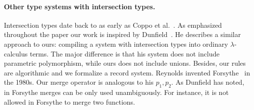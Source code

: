 \begin{comment}
only allow intersections of concrete types (classes),
whereas our language allows intersections of type variables, such as
\texttt{A \& B}. Without that vehicle, we would not be able to define
the generic \texttt{merge} function (below) for all interpretations of
a given algebra, and would incur boilerplate code:

\begin{lstlisting}{language=haskell}
let merge [A, B] (f: ExpAlg A) (g: ExpAlg B) = {
  lit (x : Int) = f.lit x ,, g.lit x,
  add (x : A & B) (y : A & B) =
    f.add x y ,, g.add x y
}
\end{lstlisting}
\end{comment}


\paragraph{Other type systems with intersection types.}
Intersection types date back to as early as Coppo et
al.~\cite{coppo1981functional}. As emphasized throughout the paper our 
work is inspired by Dunfield~\cite{dunfield2014elaborating}. He describes a similar approach to ours:
compiling a system with intersection types into ordinary $ \lambda $-calculus
terms. The major difference is that his system does not include parametric
polymorphism, while ours does not include unions. Besides, our rules are
algorithmic and we formalize a record system.
Reynolds invented Forsythe~\cite{reynolds1997design} in the 1980s. Our merge
operator is analogous to his $ p_1, p_2 $. As Dunfield
has noted, in Forsythe merges can be only used unambiguously. 
For instance, it is not allowed in Forsythe to merge two functions.


